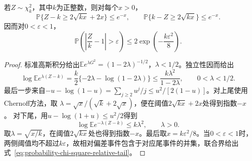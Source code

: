 \begin{lemma}
  \label{lem:probability-chi-square-tail}
  若\(Z\sim\chi_k^2\)，其中\(k\)为正整数，则对每个\(x>0\)，
  \[
    \mathbb{P}\{Z-k\geq2\sqrt{kx}+2x\}\leq e^{-x},
    \qquad
    \mathbb{P}\{k-Z\geq2\sqrt{kx}\}\leq e^{-x}.
  \]
  因而对\(0<\varepsilon<1\)，
  \begin{equation}
    \mathbb{P}\left(
      \left|\frac{Z}{k}-1\right|>\varepsilon
    \right)
    \leq2\exp\left(-\frac{k\varepsilon^2}{8}\right).
    \label{eq:probability-chi-square-relative-tail}
  \end{equation}
\end{lemma}

\begin{proof}
标准高斯积分给出\(\mathbb E e^{\lambda G^2}=(1-2\lambda)^{-1/2}\)，\(\lambda<1/2\)。独立性因而给出
\[
  \log\mathbb E e^{\lambda(Z-k)}
  =\frac{k}{2}\{-2\lambda-\log(1-2\lambda)\}
  \leq\frac{k\lambda^2}{1-2\lambda},\qquad 0<\lambda<1/2.
\]
最后一步来自\(-u-\log(1-u)=\sum_{j\geq2}u^j/j\leq u^2/[2(1-u)]\)。对上尾使用Chernoff方法，取
\(\lambda=\sqrt{x}/(\sqrt{k}+2\sqrt{x})\)，便在阈值\(2\sqrt{kx}+2x\)处得到指数\(-x\)。
对下尾，用\(u-\log(1+u)\leq u^2/2\)得到
\[
  \log\mathbb E e^{-\lambda(Z-k)}\leq k\lambda^2,\qquad\lambda>0.
\]
取\(\lambda=\sqrt{x/k}\)，在阈值\(2\sqrt{kx}\)处也得到指数\(-x\)。最后取\(x=k\varepsilon^2/8\)。当\(0<\varepsilon<1\)时，两侧阈值均不超过\(k\varepsilon\)，故相对偏差事件包含于对应尾事件的并集，联合界给出式~\eqref{eq:probability-chi-square-relative-tail}。
\end{proof}

